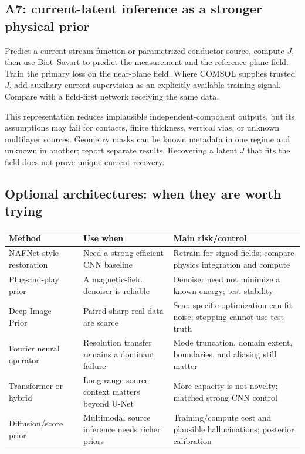 \subsection{A7: current-latent inference as a stronger physical prior}
Predict a current stream function or parametrized conductor source, compute $J$, then use Biot--Savart to predict the measurement and the reference-plane field. Train the primary loss on the near-plane field. Where COMSOL supplies trusted $J$, add auxiliary current supervision as an explicitly available training signal. Compare with a field-first network receiving the same data.

This representation reduces implausible independent-component outputs, but its assumptions may fail for contacts, finite thickness, vertical vias, or unknown multilayer sources. Geometry masks can be known metadata in one regime and unknown in another; report separate results. Recovering a latent $J$ that fits the field does not prove unique current recovery.

\subsection{Optional architectures: when they are worth trying}
\begin{tabularx}{\linewidth}{P{28mm}YY}
\toprule Method & Use when & Main risk/control\\\midrule
NAFNet-style restoration~\cite{nafnet} & Need a strong efficient CNN baseline & Retrain for signed fields; compare physics integration and compute\\
Plug-and-play prior~\cite{pnp} & A magnetic-field denoiser is reliable & Denoiser need not minimize a known energy; test stability\\
Deep Image Prior~\cite{dip} & Paired sharp real data are scarce & Scan-specific optimization can fit noise; stopping cannot use test truth\\
Fourier neural operator~\cite{fno} & Resolution transfer remains a dominant failure & Mode truncation, domain extent, boundaries, and aliasing still matter\\
Transformer or hybrid & Long-range source context matters beyond U-Net & More capacity is not novelty; matched strong CNN control\\
Diffusion/score prior~\cite{blinddps} & Multimodal source inference needs richer priors & Training/compute cost and plausible hallucinations; posterior calibration\\\bottomrule
\end{tabularx}

